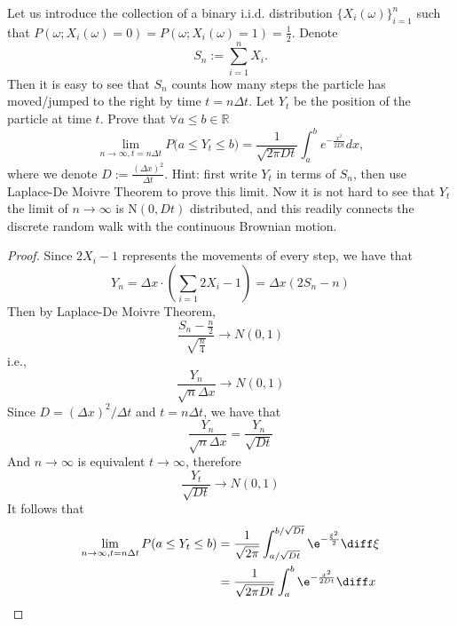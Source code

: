 \begin{question}
        Let us introduce the collection of a binary i.i.d. distribution
        $\{X_i(\omega)\}_{i=1}^n$ such that
        $P(\omega;X_i(\omega)=0)=P(\omega;X_i(\omega)=1)=\frac{1}{2}$.  Denote
        \[S_n:=\sum_{i=1}^n X_i.\]
        Then it is easy to see that $S_n$ counts how many steps
        the particle has moved/jumped to the right by time $t=n\Delta t$.
         Let $Y_t$ be the position of the particle at time $t$. 
         Prove that $\forall a\leq b\in\mathbb R$
        \[\lim_{n\rightarrow \infty, t=n\Delta t}P\big(a\leq Y_t\leq b\big)
        =\frac{1}{\sqrt{2\pi Dt}}\int_a^b e^{-\frac{x^2}{2Dt}}dx,\]
        where we denote $D:=\frac{(\Delta x)^2}{\Delta t}$. 
        Hint: first write $Y_t$ in terms of $S_n$, then use Laplace-De
        Moivre Theorem to prove this limit.  Now it is not hard to see
        that $Y_t$ the limit of $n\rightarrow\infty$ is N$(0,Dt)$ distributed,
        and this readily connects the discrete random walk with the continuous
        Brownian motion.
    \end{question}

    \begin{proof}
        Since $2X_i-1$ represents the movements of every step,
        we have that
        \[Y_n=\Delta x\cdot\left(\sum_{i=1}2X_i-1\right)
        =\Delta x(2S_n-n)\]
        Then by Laplace-De Moivre Theorem,
        \[\frac{S_n-\frac{n}{2}}{\sqrt{\frac{n}{4}}}\to N(0,1)\]
        i.e.,
        \[\frac{Y_n}{\sqrt{n}\Delta x}\to N(0,1)\]
        Since $D=(\Delta x)^2/\Delta t$ and $t=n\Delta t$,
        we have that
        \[\frac{Y_n}{\sqrt{n}\Delta x}=\frac{Y_n}{\sqrt{Dt}}\]
        And $n\to\infty$ is equivalent $t\to\infty$, therefore
        \[\frac{Y_t}{\sqrt{Dt}}\to N(0,1)\]
        It follows that
        \begin{align*}
        \lim_{n\to\infty,t=n\Delta t}P(a\leq Y_t\leq b)
        &=\frac{1}{\sqrt{2\pi}}
        \int_{a/\sqrt{Dt}}^{b/\sqrt{Dt}}\e^{-\frac{\xi^2}{2}}\diff\xi\\
        &=\frac{1}{\sqrt{2\pi Dt}}
        \int_a^b\e^{-\frac{x^2}{2Dt}}\diff x
        \end{align*}
    \end{proof}

